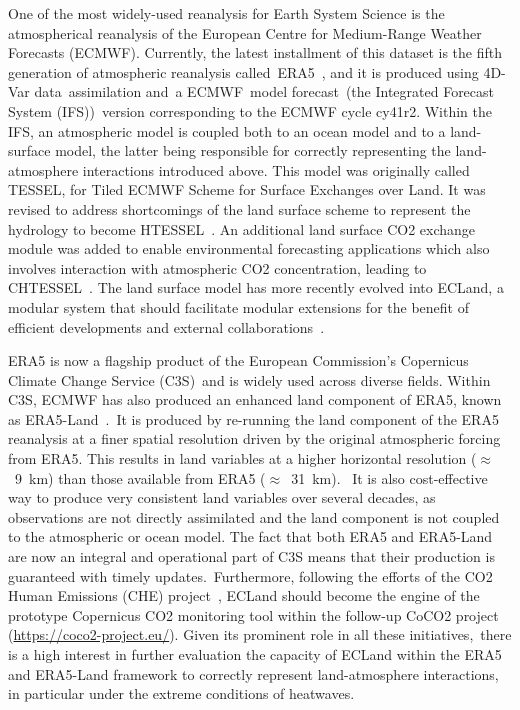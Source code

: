 \documentclass[gmd, manuscript]{copernicus}
\begin{document}
One of the most widely-used reanalysis for Earth System Science is the
atmospherical reanalysis of the European Centre for Medium-Range
Weather Forecasts (ECMWF). Currently, the latest installment of this
dataset is the fifth generation of atmospheric reanalysis
called~ERA5~\citep{Hersbach_2020}, and it is produced using 4D-Var
data~assimilation and~a ECMWF~model forecast~(the Integrated Forecast
System (IFS))~version corresponding to the ECMWF cycle cy41r2. Within
the IFS, an atmospheric model is coupled both to an ocean model and to a
land-surface model, the latter being responsible for correctly
representing the land-atmosphere interactions introduced above. This
model was originally called TESSEL, for Tiled ECMWF Scheme for Surface
Exchanges over Land. It was revised to address shortcomings of the land
surface scheme to represent the hydrology to become
HTESSEL~\citep{Balsamo_2009}. An additional land surface CO2 exchange
module was added to enable environmental forecasting applications which
also involves interaction with atmospheric CO2 concentration, leading to
CHTESSEL~\citep{Boussetta_2013}. The land surface model has more recently
evolved into ECLand, a modular system that should facilitate modular
extensions for the benefit of efficient developments and external
collaborations~\citep{Boussetta_2021}.

ERA5 is now a flagship product of the European Commission's Copernicus
Climate Change Service (C3S)~{and is widely used across diverse fields}.
Within C3S, ECMWF has also produced an enhanced land component of
ERA5, known as ERA5-Land~\citep{Munoz_Sabater_2021}.~It is produced by
re-running the land component of the ERA5 reanalysis at a finer spatial
resolution driven by the original atmospheric forcing from ERA5. This
results in land variables at a higher horizontal resolution
(\(\approx\)~9~km) than those available from ERA5
(\(\approx\)~31~km).~ It is also cost-effective way to produce
very consistent land variables over several decades, as observations are
not directly assimilated and the land component is not coupled to the
atmospheric or ocean model. The fact that both ERA5 and ERA5-Land are
now an integral and operational part of C3S means that their production
is guaranteed with timely updates.~Furthermore, following the efforts of
the CO2 Human Emissions (CHE) project~\citep{Balsamo_2021}, ECLand should
become the engine of the prototype Copernicus CO2 monitoring tool within
the follow-up CoCO2 project (\url{https://coco2-project.eu/}). Given its
prominent role in all these initiatives,~there is a high interest in
further evaluation the capacity of ECLand within the ERA5 and ERA5-Land
framework to correctly represent land-atmosphere interactions, in
particular under the extreme conditions of heatwaves.
\end{document}
